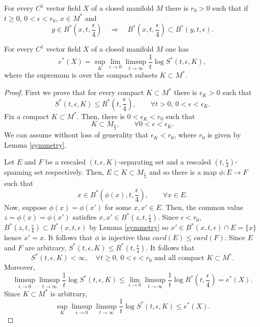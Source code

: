 \documentclass[10pt,a4paper]{amsart}
\begin{document}
\begin{lem}
\label{symmetry}
For every $C^1$ vector field $X$ of a closed manifold $M$
there is $r_0>0$ such that if $t\geq0$, $0<\epsilon<r_0$, $x\in M^*$ and
$$
y\in B^*(x,t,\frac{\epsilon}4)\quad\Longrightarrow\quad
B^*(x,t,\frac{\epsilon}4)\subset B^*(y,t,\epsilon).
$$
\end{lem}

\begin{lem}
\label{rasca}
For every $C^1$ vector field $X$ of a closed manifold $M$ one has
$$
e^*(X)=\sup_K\lim_{\epsilon\to0}\limsup_{t\to\infty}\frac{1}t\log S^*(t,\epsilon,K),
$$
where the supremum is over the compact subsets $K\subset M^*$.
\end{lem}

\begin{proof}
First we prove that for every compact $K\subset M^*$ there is
$\epsilon_K>0$ such that
$$
S^*(t,\epsilon,K)\leq R^*(t,\frac{\epsilon}4),\quad\quad\forall t>0,\, 0<\epsilon<\epsilon_K.
$$
Fix a compact $K\subset M^*$.
Then, there is $0<\epsilon_K<r_0$ such that
$$
K\subset M_{\frac{\epsilon}4},\quad\quad\forall 0<\epsilon <\epsilon_K.
$$
We can assume without loss of generality that $\epsilon_K<r_0$, where
$r_0$ is given by Lemma \ref{symmetry}.

Let $E$ and $F$ be a rescaled $(t,\epsilon,K)$-separating set and a rescaled $(t,\frac{\epsilon}4)$-spanning set respectively.
Then, $E\subset K\subset M_{\frac{\epsilon}4}$ and so there is a map $\phi:E\to F$ such that
$$
x\in B^*(\phi(x),t,\frac{\epsilon}4),\quad\quad\forall x\in E.
$$
Now, suppose $\phi(x)=\phi(x')$ for some $x,x'\in E$.
Then, the common value $z=\phi(x)=\phi(x')$ satisfies
$x,x'\in B^*(z,t,\frac{\epsilon}4)$. Since $\epsilon<r_0$,
$B^*(z,t,\frac{\epsilon}4)\subset B^*(x,t,\epsilon)$ by Lemma \ref{symmetry}
so $x'\in B^*(x,t,\epsilon)\cap E=\{x\}$ hence $x'=x$.
It follows that $\phi$ is injective thus $card(E)\leq card(F)$. Since $E$ and $F$ are arbitrary, $S^*(t,\epsilon,K)\leq R^*(t,\frac{\epsilon}4)$. It follows that
\begin{equation}
\label{veneno}
S^*(t,\epsilon,K)<\infty,\quad\forall t\geq0,\, 0<\epsilon< r_0\mbox{ and all compact }K\subset M^*.
\end{equation}
Moreover,
$$
\limsup_{\epsilon\to0}\limsup_{t\to\infty}\frac{1}t\log S^*(t,\epsilon,K)\leq \lim_{\epsilon\to0}\limsup_{t\to\infty}\frac{1}t\log R^*(t,\frac{\epsilon}4)=e^*(X).
$$
Since $K\subset M^*$ is arbitrary,
$$
\sup_K\limsup_{\epsilon\to0}\limsup_{t\to\infty}\frac{1}t\log S^*(t,\epsilon,K)\leq e^*(X).
$$


\end{proof}
\end{document}
